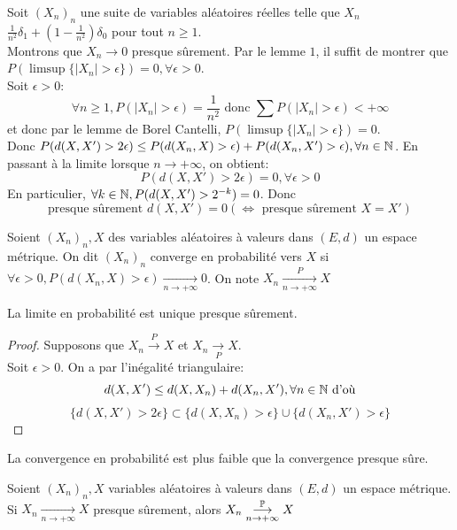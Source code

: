 \documentclass[]{report}
\begin{document}
    \begin{ex}{}{}
        Soit $(X_n)_n$ une suite de variables aléatoires réelles telle que $X_n$~ $\frac{1}{n^2}\delta_1+(1-\frac{1}{n^2})\delta_0$ pour tout $n\ge 1$.\\
        Montrons que $X_n\to 0$ presque sûrement. Par le lemme $1$, il suffit de montrer que $P(\limsup\{|X_n|>\epsilon\})=0,\forall \epsilon>0$.\\
        Soit $\epsilon>0$:
        \[\forall n\ge 1,P(|X_n|>\epsilon)=\frac{1}{n^2}\text{ donc }\sum P(|X_n|>\epsilon)<+\infty\]
        et donc par le lemme de Borel Cantelli, $P(\limsup \{|X_n|>\epsilon\})=0$.\\
        Donc $P(d(X,X')>2\epsilon)\le P(d(X_n,X)>\epsilon)+P(d(X_n,X')>\epsilon),\forall n\in \mathbb{N}$. En passant à la limite lorsque $n\to +\infty$, on obtient:
        \[P(d(X,X')>2\epsilon)=0,\forall \epsilon>0\]
        En particulier, $\forall k\in \mathbb{N},P(d(X,X')>2^{-k})=0$. Donc
        \[\text{presque sûrement }d(X,X')=0 (\iff \text{ presque sûrement }X=X')\]
    \end{ex}

    \begin{df}{}{}
        Soient $(X_n)_n,X$ des variables aléatoires à valeurs dans $(E,d)$ un espace métrique. On dit $(X_n)_n$ converge en probabilité vers $X$ si $\forall \epsilon>0, P(d(X_n,X)>\epsilon)\underset{n\to +\infty}{\longrightarrow}0$. On note $X_n\underset{n\to +\infty}{\overset{P}{\longrightarrow}}X$
    \end{df}

    \begin{lm}{}{}
        La limite en probabilité est unique presque sûrement.
    \end{lm}

    \begin{proof}
        Supposons que $X_n\overset{P}{\longrightarrow}X$ et $X_n\underset{P}{\longrightarrow} X$.\\
        Soit $\epsilon>0$. On a par l'inégalité triangulaire:
        \[d(X,X')\le d(X,X_n)+d(X_n,X'),\forall n\in \mathbb{N}\text{ d'où}\]
        \[\{d(X,X')>2\epsilon\}\subset \{d(X,X_n)>\epsilon\}\cup\{d(X_n,X')>\epsilon\}\]
    \end{proof}

    La convergence en probabilité est plus faible que la convergence presque sûre.
    
    \begin{lm}{}{}
        Soient $(X_n)_n,X$ variables aléatoires à valeurs dans $(E,d)$ un espace métrique. Si $X_n\underset{n\to+\infty}{\longrightarrow}X$ presque sûrement, alors $X_n\overunderset{\Pa}{n\to +\infty}{\longrightarrow}X$
    \end{lm}
\end{document}
